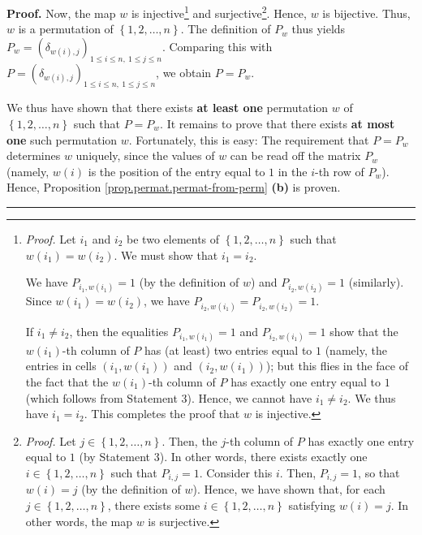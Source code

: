 \documentclass[numbers=enddot,12pt,final,onecolumn,notitlepage]{scrartcl}%
\theoremstyle{definition}
\newenvironment{proof}[1][Proof]{\noindent\textbf{#1.} }{\ \rule{0.5em}{0.5em}}
\begin{document}
\begin{proof}
Now, the map $w$ is injective\footnote{\textit{Proof.} Let $i_{1}$ and $i_{2}$
be two elements of $\left\{  1,2,\ldots,n\right\}  $ such that $w\left(
i_{1}\right)  =w\left(  i_{2}\right)  $. We must show that $i_{1}=i_{2}$.
\par
We have $P_{i_{1},w\left(  i_{1}\right)  }=1$ (by the definition of $w$) and
$P_{i_{2},w\left(  i_{2}\right)  }=1$ (similarly). Since $w\left(
i_{1}\right)  =w\left(  i_{2}\right)  $, we have $P_{i_{2},w\left(
i_{1}\right)  }=P_{i_{2},w\left(  i_{2}\right)  }=1$.
\par
If $i_{1}\neq i_{2}$, then the equalities $P_{i_{1},w\left(  i_{1}\right)
}=1$ and $P_{i_{2},w\left(  i_{1}\right)  }=1$ show that the $w\left(
i_{1}\right)  $-th column of $P$ has (at least) two entries equal to $1$
(namely, the entries in cells $\left(  i_{1},w\left(  i_{1}\right)  \right)  $
and $\left(  i_{2},w\left(  i_{1}\right)  \right)  $); but this flies in the
face of the fact that the $w\left(  i_{1}\right)  $-th column of $P$ has
exactly one entry equal to $1$ (which follows from Statement 3). Hence, we
cannot have $i_{1}\neq i_{2}$. We thus have $i_{1}=i_{2}$. This completes the
proof that $w$ is injective.} and surjective\footnote{\textit{Proof.} Let
$j\in\left\{  1,2,\ldots,n\right\}  $. Then, the $j$-th column of $P$ has
exactly one entry equal to $1$ (by Statement 3). In other words, there exists
exactly one $i\in\left\{  1,2,\ldots,n\right\}  $ such that $P_{i,j}=1$.
Consider this $i$. Then, $P_{i,j}=1$, so that $w\left(  i\right)  =j$ (by the
definition of $w$). Hence, we have shown that, for each $j\in\left\{
1,2,\ldots,n\right\}  $, there exists some $i\in\left\{  1,2,\ldots,n\right\}
$ satisfying $w\left(  i\right)  =j$. In other words, the map $w$ is
surjective.}. Hence, $w$ is bijective. Thus, $w$ is a permutation of $\left\{
1,2,\ldots,n\right\}  $. The definition of $P_{w}$ thus yields $P_{w}=\left(
\delta_{w\left(  i\right)  ,j}\right)  _{1\leq i\leq n,\ 1\leq j\leq n}$.
Comparing this with $P=\left(  \delta_{w\left(  i\right)  ,j}\right)  _{1\leq
i\leq n,\ 1\leq j\leq n}$, we obtain $P=P_{w}$.

We thus have shown that there exists \textbf{at least one} permutation $w$ of
$\left\{  1,2,\ldots,n\right\}  $ such that $P=P_{w}$. It remains to prove
that there exists \textbf{at most one} such permutation $w$. Fortunately, this
is easy: The requirement that $P=P_{w}$ determines $w$ uniquely, since the
values of $w$ can be read off the matrix $P_{w}$ (namely, $w\left(  i\right)
$ is the position of the entry equal to $1$ in the $i$-th row of $P_{w}$).
Hence, Proposition \ref{prop.permat.permat-from-perm} \textbf{(b)} is proven.
\end{proof}
\end{document}
